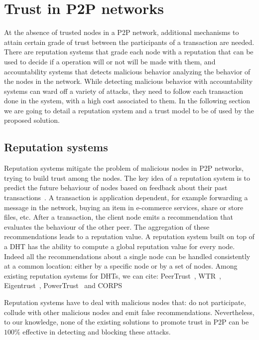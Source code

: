 \section{Trust in P2P networks}
\label{sec:trust_in_p2p}

At the absence of trusted nodes in a P2P network, additional mechanisms to
attain certain grade of trust between the participants of a transaction are
needed. There are reputation systems that grade each node with a reputation
that can be used to decide if a operation will or not will be made with them,
and accountability systems that detects malicious behavior analyzing the
behavior of the nodes in the network. While  detecting malicious behavior with
accountability systems can ward off a variety of attacks, they need to follow
each transaction done in the system, with a high cost associated to them.
 In the following section we are going to
detail a reputation system and a trust model to be of used by the proposed
solution.


\subsection{Reputation systems}
\label{sec:reputation_systems}
Reputation systems mitigate the problem of malicious nodes in
P2P networks, trying to build trust among the nodes. The key
idea of a reputation system is to predict the future behaviour
of nodes based on feedback about their past
transactions~\cite{Resnick:2000:RS:355112.355122}. A
transaction is application dependent, for example forwarding a
message in the network, buying an item in e-commerce services,
share or store files, etc. After a transaction, the client node emits
a recommendation that evaluates the behaviour of the other peer.
The aggregation of these recommendations leads to a reputation
value.
A reputation system built on top of a DHT has the ability
to compute a global reputation value for every node. Indeed
all the recommendations about a single node can be handled
consistently at a common location: either by a specific node
or by a set of nodes. Among existing reputation systems for
DHTs, we can cite: PeerTrust~\cite{xiong2004peertrust}, WTR~\cite{bonnaire2009wtr},
Eigentrust~\cite{kamvar2003eigentrust},
PowerTrust~\cite{rahbar2007powertrust} and CORPS~\cite{rosas2011corps}

Reputation systems have to deal with malicious nodes that:
do not participate, collude with other malicious nodes and
emit false recommendations. Nevertheless, to our knowledge,
none of the existing solutions to promote trust in P2P can be
$100\%$ effective in detecting and blocking these attacks.

